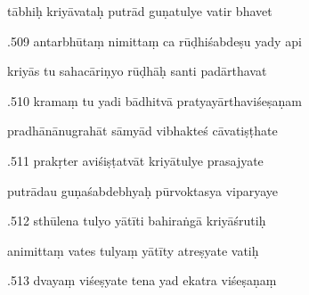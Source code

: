 \documentclass[article,12pt,a4paper]{memoir}%
\newcounter{parCount}
\begin{document}
	  
	  \pstart \leavevmode%
	tābhiḥ kriyāvataḥ putrād guṇatulye vatir bhavet 
	{}
	\pend%
      

	  
	  \pstart {}.509 antarbhūtaṃ nimittaṃ ca rūḍhiśabdeṣu yady api 
	{}
	\pend%
      

	  
	  \pstart \leavevmode%
	kriyās tu sahacāriṇyo rūḍhāḥ santi padārthavat 
	{}
	\pend%
      

	  
	  \pstart {}.510 kramaṃ tu yadi bādhitvā   pratyayārthaviśeṣaṇam 
	{}
	\pend%
      

	  
	  \pstart \leavevmode%
	pradhānānugrahāt sāmyād vibhakteś cāvatiṣṭhate 
	{}
	\pend%
      

	  
	  \pstart {}.511 prakṛter aviśiṣṭatvāt kriyātulye prasajyate 
	{}
	\pend%
      

	  
	  \pstart \leavevmode%
	putrādau guṇaśabdebhyaḥ pūrvoktasya viparyaye 
	{}
	\pend%
      

	  
	  \pstart {}.512 sthūlena tulyo yātīti bahiraṅgā kriyāśrutiḥ 
	{}
	\pend%
      

	  
	  \pstart \leavevmode%
	animittaṃ vates tulyaṃ yātīty atreṣyate vatiḥ 
	{}
	\pend%
      

	  
	  \pstart {}.513 dvayaṃ viśeṣyate tena yad ekatra viśeṣaṇaṃ 
	{}
	\pend%
      
\end{document}
